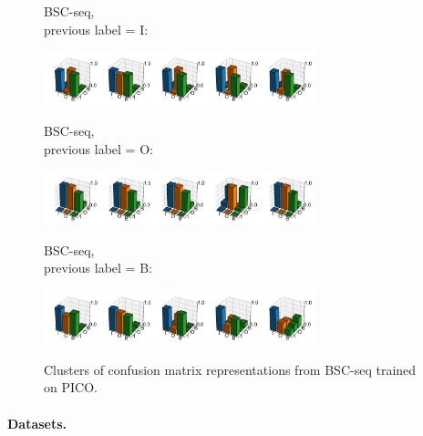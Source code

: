 \begin{figure}[h]
\begin{minipage}[b][1cm][l]{0.2\textwidth} 
BSC-seq, \\
previous label = I:
\end{minipage}
  \includegraphics[width=0.7\textwidth, clip=True, trim=20 16 0 28]{figures/worker_models/seq_prev0}
\\
\begin{minipage}[b][1cm][l]{0.2\textwidth} 
BSC-seq, \\
previous label = O:
\end{minipage}
  \includegraphics[width=0.7\textwidth, clip=True, trim=20 16 0 28]{figures/worker_models/seq_prev1}
\\
\begin{minipage}[b][1cm][l]{0.2\textwidth} 
BSC-seq,\\
 previous label = B:
\end{minipage}
  \includegraphics[width=0.7\textwidth, clip=True, trim=20 17 0 28]{figures/worker_models/seq_prev2}
\\
\caption{Clusters of confusion matrix representations from BSC-seq trained on PICO. 
}
\label{fig:conf_mat_clusters}
\end{figure}

\paragraph{Datasets. }\label{sec:expts}

